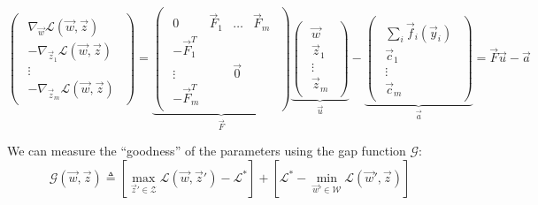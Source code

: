 \begin{equation}
  \begin{pmatrix}
    \begin{array}{c}
      \nabla_{\vec w} \mathcal{L}(\vec w,\vec z)\\
      -\nabla_{\vec z_1} \mathcal{L}(\vec w,\vec z)\\
      \vdots\\
      -\nabla_{\vec z_m} \mathcal{L}(\vec w,\vec z)
    \end{array}
  \end{pmatrix} =
  \underbrace{
    \begin{pmatrix}
      \begin{array}{cccc}
        0 & \vec F_1 & \dots & \vec F_m\\
        -\vec F_1^T & & &\\
        \vdots & & \vec 0 &\\
        -\vec F_m^T & & &
      \end{array}
    \end{pmatrix}}_{\vec F}
  \underbrace{
    \begin{pmatrix}
      \begin{array}{c}
        \vec w\\
        \vec z_1\\
        \vdots\\
        \vec z_m
      \end{array}
    \end{pmatrix}}_{\vec u}-
  \underbrace{
    \begin{pmatrix}
      \begin{array}{c}
        \sum_i \vec f_i(\vec y_i)\\
        \vec c_1\\
        \vdots\\
        \vec c_m
      \end{array}
    \end{pmatrix}}_{\vec a} = \vec F \vec u - \vec a
\end{equation}

We can measure the ``goodness'' of the parameters using the gap function
$\mathcal{G}$:
\begin{equation}
  \mathcal{G}(\vec w, \vec z) \triangleq \left[ \max_{\vec z' \in \mathcal{Z}}
\mathcal{L}(\vec w,\vec z') - \mathcal{L}^* \right] + \left[ \mathcal{L}^* -
\min_{\vec w' \in \mathcal{W}} \mathcal{L}(\vec w', \vec z) \right]
\end{equation}

